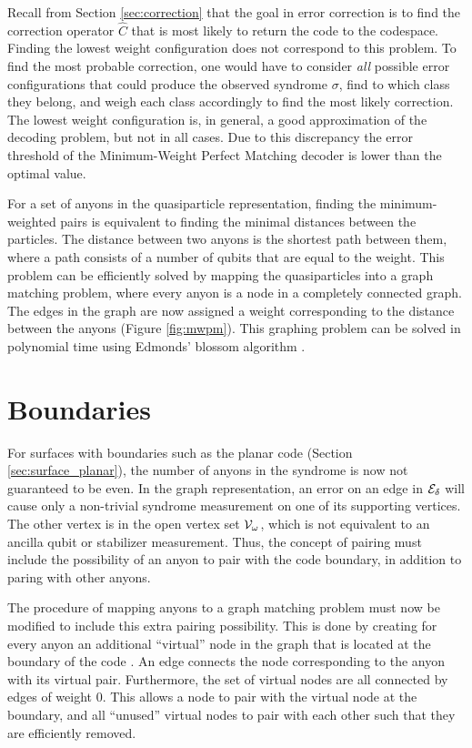 Recall from Section \ref{sec:correction} that the goal in error correction is to find the correction operator $\hat{C}$ that is most likely to return the code to the codespace. Finding the lowest weight configuration does not correspond to this problem. To find the most probable correction, one would have to consider \emph{all} possible error configurations that could produce the observed syndrome $\sigma$, find to which class they belong, and weigh each class accordingly to find the most likely correction. The lowest weight configuration is, in general, a good approximation of the decoding problem, but not in all cases. Due to this discrepancy the error threshold of the Minimum-Weight Perfect Matching decoder is lower than the optimal value. 

For a set of anyons in the quasiparticle representation, finding the minimum-weighted pairs is equivalent to finding the minimal distances between the particles. The distance between two anyons is the shortest path between them, where a path consists of a number of qubits that are equal to the weight. This problem can be efficiently solved by mapping the quasiparticles into a graph matching problem, where every anyon is a node in a completely connected graph. The edges in the graph are now assigned a weight corresponding to the distance between the anyons (Figure \ref{fig:mwpm}). This graphing problem can be solved in polynomial time using Edmonds' blossom algorithm \cite{edmonds1965paths}. 



\section{Boundaries}\label{sec:mwpmboundaries}

For surfaces with boundaries such as the planar code (Section \ref{sec:surface_planar}), the number of anyons in the syndrome is now not guaranteed to be even. In the graph representation, an error on an edge in $\mathcal{E}_\delta$ will cause only a non-trivial syndrome measurement on one of its supporting vertices. The other vertex is in the open vertex set $\mathcal{V}_\omega$, which is not equivalent to an ancilla qubit or stabilizer measurement. Thus, the concept of pairing must include the possibility of an anyon to pair with the code boundary, in addition to paring with other anyons. 

The procedure of mapping anyons to a graph matching problem must now be modified to include this extra pairing possibility. This is done by creating for every anyon an additional ``virtual'' node in the graph that is located at the boundary of the code \cite{wang2011surface}. An edge connects the node corresponding to the anyon with its virtual pair. Furthermore, the set of virtual nodes are all connected by edges of weight 0. This allows a node to pair with the virtual node at the boundary, and all ``unused'' virtual nodes to pair with each other such that they are efficiently removed. 

